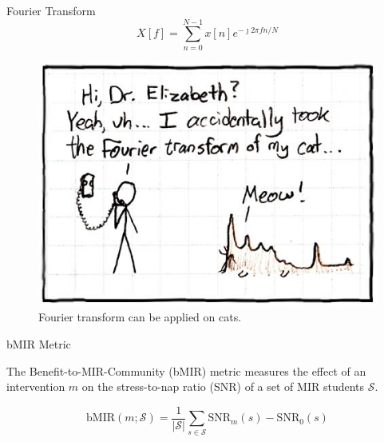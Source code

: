 \documentclass[final]{beamer}
\newlength{\colwidth}
\begin{document}
\begin{frame}[t]
\begin{columns}[t]
\begin{column}{\colwidth}
\begin{block}{Fourier Transform}
        \begin{equation}
            X[f] = \sum_{n=0}^{N-1}x[n]e^{-\jmath 2\pi f n/N}
        \end{equation}

        \begin{figure}
            \centering
            \includegraphics[width=\columnwidth]{figures/ft.jpg}
            \caption{Fourier transform can be applied on cats.}
            \label{fig:ftcat}
        \end{figure}
    \end{block}

    \begin{block}{bMIR Metric}

    The Benefit-to-MIR-Community (bMIR) metric measures the effect of an intervention $m$ on the stress-to-nap ratio (SNR) of a set of MIR students $\mathcal{S}$.
    
    \begin{equation}
        \text{bMIR}(m; \mathcal{S}) = \dfrac{1}{|\mathcal{S}|}\sum_{s \in \mathcal{S}} \text{SNR}_m(s) - \text{SNR}_0(s)
    \end{equation}
        

\end{block}
\end{column}
\end{columns}
\end{frame}
\end{document}
